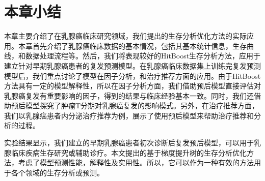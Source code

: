 \section{本章小结}

本章主要介绍了在乳腺癌临床研究领域，我们提出的生存分析优化方法的实际应用。本章首先介绍了乳腺癌临床数据的基本情况，包括其基本统计信息，生存曲线，和数据处理流程等。然后，我们将表现较好的HitBoost生存分析方法，应用于建立针对早期乳腺癌患者的复发预测模型。在乳腺癌临床数据集上训练完复发预测模型后，我们重点讨论了模型在因子分析，和治疗推荐方面的应用。由于HitBoost方法具有一定的模型解释性，所以在因子分析方面，我们借助预后模型直接评估对乳腺癌复发有重要影响的因子，得到的结果与临床经验基本一致。同时，我们还借助预后模型探究了肿瘤T分期对乳腺癌复发的影响模式。另外，在治疗推荐方面，我们以乳腺癌患者内分泌治疗推荐为例，展示了使用预后模型来帮助治疗推荐和分析的过程。

实验结果显示，我们建立的早期乳腺癌患者初次诊断后复发预后模型，可以用于乳腺临床疾病生存研究或辅助诊疗。本文提出的基于梯度提升树的生存分析优化方法，考虑了模型预测性能，解释性及实用性。所以，它可以作为一种有效的方法用于各个领域的生存分析或预测。

